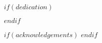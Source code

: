 \documentclass[12pt,final,CPage]{ufthesis} %
\begin{document}






\maketitle
\makecopyright


$if(dedication)$
	\dedication{$dedication$}
$endif$ %


$if(acknowledgements)$
$endif$ %


\tableofcontents %


\end{document}
